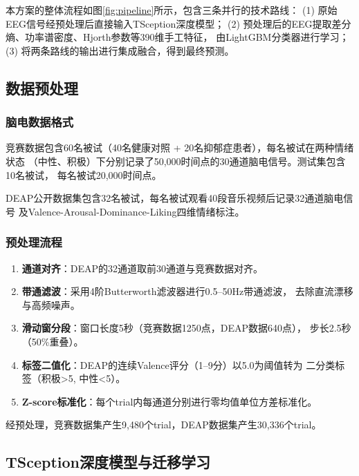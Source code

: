 \documentclass[12pt,a4paper]{ctexrep}
\begin{document}
本方案的整体流程如图\ref{fig:pipeline}所示，包含三条并行的技术路线：
(1) 原始EEG信号经预处理后直接输入TSception深度模型；
(2) 预处理后的EEG提取差分熵、功率谱密度、Hjorth参数等390维手工特征，
由LightGBM分类器进行学习；
(3) 将两条路线的输出进行集成融合，得到最终预测。


\subsection{数据预处理}

\subsubsection{脑电数据格式}

竞赛数据包含60名被试（40名健康对照 + 20名抑郁症患者），每名被试在两种情绪状态
（中性、积极）下分别记录了50,000时间点的30通道脑电信号。测试集包含10名被试，
每名被试20,000时间点。

DEAP公开数据集包含32名被试，每名被试观看40段音乐视频后记录32通道脑电信号
及Valence-Arousal-Dominance-Liking四维情绪标注。

\subsubsection{预处理流程}

\begin{enumerate}
    \item \textbf{通道对齐}：DEAP的32通道取前30通道与竞赛数据对齐。
    \item \textbf{带通滤波}：采用4阶Butterworth滤波器进行0.5--50Hz带通滤波，
          去除直流漂移与高频噪声。
    \item \textbf{滑动窗分段}：窗口长度5秒（竞赛数据1250点，DEAP数据640点），
          步长2.5秒（50\%重叠）。
    \item \textbf{标签二值化}：DEAP的连续Valence评分（1--9分）以5.0为阈值转为
          二分类标签（积极>5, 中性<5）。
    \item \textbf{Z-score标准化}：每个trial内每通道分别进行零均值单位方差标准化。
\end{enumerate}

经预处理，竞赛数据集产生9,480个trial，DEAP数据集产生30,336个trial。

\subsection{TSception深度模型与迁移学习}
\end{document}
